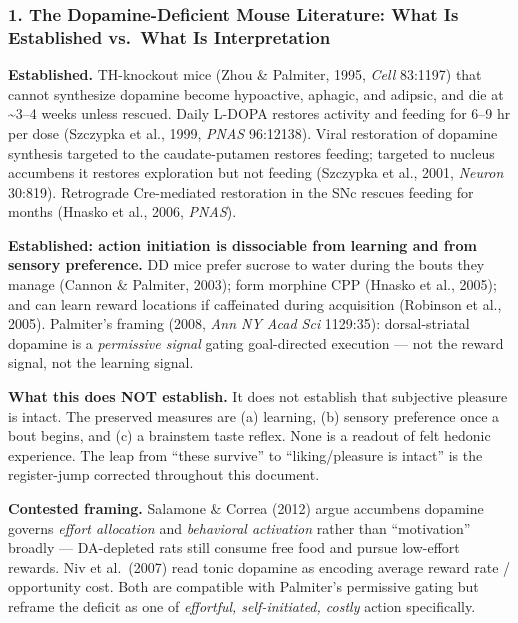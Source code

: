 \subsubsection{1. The Dopamine-Deficient Mouse Literature: What Is Established vs.~What Is Interpretation}\label{02_dopamine_action-the-dopamine-deficient-mouse-literature-what-is-established-vs.-what-is-interpretation}

\textbf{Established.} TH-knockout mice (Zhou \& Palmiter, 1995, \emph{Cell} 83:1197) that cannot synthesize dopamine become hypoactive, aphagic, and adipsic, and die at \textasciitilde3--4 weeks unless rescued. Daily L-DOPA restores activity and feeding for 6--9 hr per dose (Szczypka et al., 1999, \emph{PNAS} 96:12138). Viral restoration of dopamine synthesis targeted to the caudate-putamen restores feeding; targeted to nucleus accumbens it restores exploration but not feeding (Szczypka et al., 2001, \emph{Neuron} 30:819). Retrograde Cre-mediated restoration in the SNc rescues feeding for months (Hnasko et al., 2006, \emph{PNAS}).

\textbf{Established: action initiation is dissociable from learning and from sensory preference.} DD mice prefer sucrose to water during the bouts they manage (Cannon \& Palmiter, 2003); form morphine CPP (Hnasko et al., 2005); and can learn reward locations if caffeinated during acquisition (Robinson et al., 2005). Palmiter's framing (2008, \emph{Ann NY Acad Sci} 1129:35): dorsal-striatal dopamine is a \emph{permissive signal} gating goal-directed execution --- not the reward signal, not the learning signal.

\textbf{What this does NOT establish.} It does not establish that subjective pleasure is intact. The preserved measures are (a) learning, (b) sensory preference once a bout begins, and (c) a brainstem taste reflex. None is a readout of felt hedonic experience. The leap from ``these survive'' to ``liking/pleasure is intact'' is the register-jump corrected throughout this document.

\textbf{Contested framing.} Salamone \& Correa (2012) argue accumbens dopamine governs \emph{effort allocation} and \emph{behavioral activation} rather than ``motivation'' broadly --- DA-depleted rats still consume free food and pursue low-effort rewards. Niv et al.~(2007) read tonic dopamine as encoding average reward rate / opportunity cost. Both are compatible with Palmiter's permissive gating but reframe the deficit as one of \emph{effortful, self-initiated, costly} action specifically.

